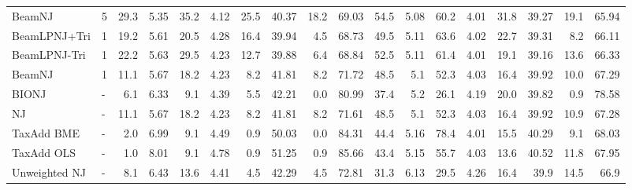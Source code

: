 \begin{tabular}{llrrrrrrrr|rrrrrrrr}
BeamNJ & 5 & 29.3 & 5.35 & 35.2 & 4.12 & 25.5 & 40.37 & 18.2 & 69.03 & 54.5 & 5.08 & 60.2 & 4.01 & 31.8 & 39.27 & 19.1 & 65.94 \\
BeamLPNJ+Tri & 1 & 19.2 & 5.61 & 20.5 & 4.28 & 16.4 & 39.94 & 4.5 & 68.73 & 49.5 & 5.11 & 63.6 & 4.02 & 22.7 & 39.31 & 8.2 & 66.11 \\
BeamLPNJ-Tri & 1 & 22.2 & 5.63 & 29.5 & 4.23 & 12.7 & 39.88 & 6.4 & 68.84 & 52.5 & 5.11 & 61.4 & 4.01 & 19.1 & 39.16 & 13.6 & 66.33 \\
BeamNJ & 1 & 11.1 & 5.67 & 18.2 & 4.23 & 8.2 & 41.81 & 8.2 & 71.72 & 48.5 & 5.1 & 52.3 & 4.03 & 16.4 & 39.92 & 10.0 & 67.29 \\
BIONJ & - & 6.1 & 6.33 & 9.1 & 4.39 & 5.5 & 42.21 & 0.0 & 80.99 & 37.4 & 5.2 & 26.1 & 4.19 & 20.0 & 39.82 & 0.9 & 78.58 \\
NJ & - & 11.1 & 5.67 & 18.2 & 4.23 & 8.2 & 41.81 & 8.2 & 71.61 & 48.5 & 5.1 & 52.3 & 4.03 & 16.4 & 39.92 & 10.9 & 67.28 \\
TaxAdd BME & - & 2.0 & 6.99 & 9.1 & 4.49 & 0.9 & 50.03 & 0.0 & 84.31 & 44.4 & 5.16 & 78.4 & 4.01 & 15.5 & 40.29 & 9.1 & 68.03 \\
TaxAdd OLS & - & 1.0 & 8.01 & 9.1 & 4.78 & 0.9 & 51.25 & 0.9 & 85.66 & 43.4 & 5.15 & 55.7 & 4.03 & 13.6 & 40.52 & 11.8 & 67.95 \\
Unweighted NJ & - & 8.1 & 6.43 & 13.6 & 4.41 & 4.5 & 42.29 & 4.5 & 72.81 & 31.3 & 6.13 & 29.5 & 4.26 & 16.4 & 39.9 & 14.5 & 66.9 \\
\bottomrule
\end{tabular}
